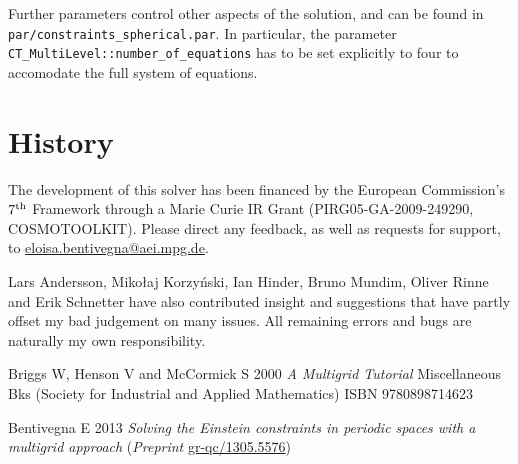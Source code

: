 Further parameters control other aspects of the solution, and can be
found in \texttt{par/constraints\_spherical.par}. In particular, the
parameter \texttt{CT\_MultiLevel::number\_of\_equations} has to be set
explicitly to four to accomodate the full system of equations.

\section{History}
The development of this solver has been financed by the European
Commission's $7^{\rm th}$ Framework through a Marie Curie IR Grant 
(PIRG05-GA-2009-249290, COSMOTOOLKIT). Please direct any feedback, 
as well as requests for support, to 
\href{mailto:eloisa.bentivegna@aei.mpg.de}{eloisa.bentivegna@aei.mpg.de}.

Lars Andersson, Miko\l{}aj Korzy\'nski, Ian Hinder, Bruno Mundim, 
Oliver Rinne and Erik Schnetter have also contributed insight and
suggestions that have partly offset my bad judgement on many issues.
All remaining errors and bugs are naturally my own responsibility. 

\begin{thebibliography}{9}

Briggs W, Henson V and McCormick S 2000 {\em A Multigrid Tutorial\/}
  Miscellaneous Bks (Society for Industrial and Applied Mathematics) ISBN
  9780898714623

Bentivegna E 2013 \textit{Solving the Einstein constraints in periodic spaces 
with a multigrid approach} (\textit{Preprint} 
\href{http://arxiv.org/abs/arXiv:1305.5576}{gr-qc/1305.5576})

\end{thebibliography}



